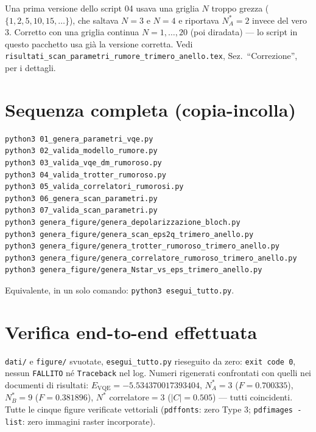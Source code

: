 \documentclass[11pt,a4paper]{article}
\begin{document}
Una prima versione dello script 04 usava una griglia $N$ troppo grezza
($\{1,2,5,10,15,\ldots\}$), che saltava $N=3$ e $N=4$ e riportava
$N^*_A=2$ invece del vero $3$. Corretto con una griglia continua
$N=1,\ldots,20$ (poi diradata) --- lo script in questo pacchetto usa già
la versione corretta. Vedi
\texttt{risultati\_scan\_parametri\_rumore\_trimero\_anello.tex},
Sez.\ ``Correzione'', per i dettagli.

\section{Sequenza completa (copia-incolla)}

\begin{verbatim}
python3 01_genera_parametri_vqe.py
python3 02_valida_modello_rumore.py
python3 03_valida_vqe_dm_rumoroso.py
python3 04_valida_trotter_rumoroso.py
python3 05_valida_correlatori_rumorosi.py
python3 06_genera_scan_parametri.py
python3 07_valida_scan_parametri.py
python3 genera_figure/genera_depolarizzazione_bloch.py
python3 genera_figure/genera_scan_eps2q_trimero_anello.py
python3 genera_figure/genera_trotter_rumoroso_trimero_anello.py
python3 genera_figure/genera_correlatore_rumoroso_trimero_anello.py
python3 genera_figure/genera_Nstar_vs_eps_trimero_anello.py
\end{verbatim}
Equivalente, in un solo comando: \texttt{python3 esegui\_tutto.py}.

\section{Verifica end-to-end effettuata}

\texttt{dati/} e \texttt{figure/} svuotate, \texttt{esegui\_tutto.py}
rieseguito da zero: \texttt{exit code 0}, nessun \texttt{FALLITO} n\'e
\texttt{Traceback} nel log. Numeri rigenerati confrontati con quelli nei
documenti di risultati: $E_\text{VQE}=-5.534370017393404$,
$N^*_A=3$ ($F=0.700335$), $N^*_B=9$ ($F=0.381896$), $N^*$
correlatore$=3$ ($|C|=0.505$) --- tutti coincidenti. Tutte le cinque
figure verificate vettoriali (\texttt{pdffonts}: zero Type 3;
\texttt{pdfimages -list}: zero immagini raster incorporate).
\end{document}
